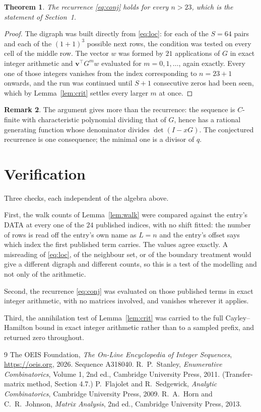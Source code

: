 \documentclass[11pt,a4paper]{article}
\theoremstyle{plain}
\newtheorem{theorem}{Theorem}
\theoremstyle{definition}
\newtheorem{remark}[theorem]{Remark}
\begin{document}
\begin{theorem}
The recurrence \eqref{eq:conj} holds for every $n>23$, which is the statement of
Section~1.
\end{theorem}

\begin{proof}
The digraph was built directly from \eqref{eq:loc}: for each of the $S=64$ pairs and each
of the $(1+1)^{3}$ possible next rows, the condition was tested on every cell of
the middle row. The vector $w$ was formed by $21$ applications of $G$ in exact integer
arithmetic and $\mathbf{v}^{\!\top}G^{m}w$ evaluated for $m=0,1,\dots$, again exactly.
Every one of those integers vanishes from the index corresponding to $n=23+1$ onwards,
and the run was continued until $S+1$ consecutive zeros had been seen, which by
Lemma~\ref{lem:crit} settles every larger $m$ at once.
\end{proof}

\begin{remark}
The argument gives more than the recurrence: the sequence is $C$-finite with characteristic
polynomial dividing that of $G$, hence has a rational generating function whose denominator
divides $\det(I-xG)$. The conjectured recurrence is one consequence; the minimal one is a
divisor of $q$.
\end{remark}

\section{Verification}

Three checks, each independent of the algebra above.

First, the walk counts of Lemma~\ref{lem:walk} were compared against the entry's DATA at
every one of the $24$ published indices, with no shift fitted: the number of rows is
read off the entry's own name as $L=n$ and the entry's offset says which index the first
published term carries. The values agree exactly. A misreading of \eqref{eq:loc}, of the
neighbour set, or of the boundary treatment would give a different digraph and different
counts, so this is a test of the modelling and not only of the arithmetic.

Second, the recurrence \eqref{eq:conj} was evaluated on those published terms in exact
integer arithmetic, with no matrices involved, and vanishes wherever it applies.

Third, the annihilation test of Lemma~\ref{lem:crit} was carried to the full
Cayley--Hamilton bound in exact integer arithmetic rather than to a sampled prefix, and
returned zero throughout.

\begin{thebibliography}{9}
 The OEIS Foundation, \emph{The On-Line Encyclopedia of Integer
Sequences}, \url{https://oeis.org}, 2026. Sequence A318040.
 R.~P.~Stanley, \emph{Enumerative Combinatorics}, Volume 1, 2nd ed.,
Cambridge University Press, 2011. (Transfer-matrix method, Section 4.7.)
 P.~Flajolet and R.~Sedgewick, \emph{Analytic Combinatorics}, Cambridge
University Press, 2009.
 R.~A.~Horn and C.~R.~Johnson, \emph{Matrix Analysis}, 2nd ed., Cambridge
University Press, 2013.
\end{thebibliography}
\end{document}
